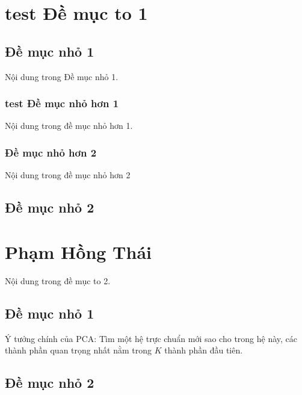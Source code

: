 \documentclass[12pt]{article}
\begin{document}
\tableofcontents
\section{test Đề mục to 1}
\subsection{Đề mục nhỏ 1}
Nội dung trong Đề mục nhỏ 1.
\subsubsection{test Đề mục nhỏ hơn 1}
Nội dung trong đề mục nhỏ hơn 1.
\subsubsection{Đề mục nhỏ hơn 2}
Nội dung trong đề mục nhỏ hơn 2
\subsection{Đề mục nhỏ 2}

\section{Phạm Hồng Thái}
Nội dung trong đề mục to 2.
\subsection{Đề mục nhỏ 1}
\caption[]{Ý tưởng chính của PCA: Tìm một hệ trực chuẩn mới sao cho trong hệ này, các thành phần quan trọng nhất nằm trong $K$ thành phần đầu tiên.}
\subsection{Đề mục nhỏ 2}
\end{document}
